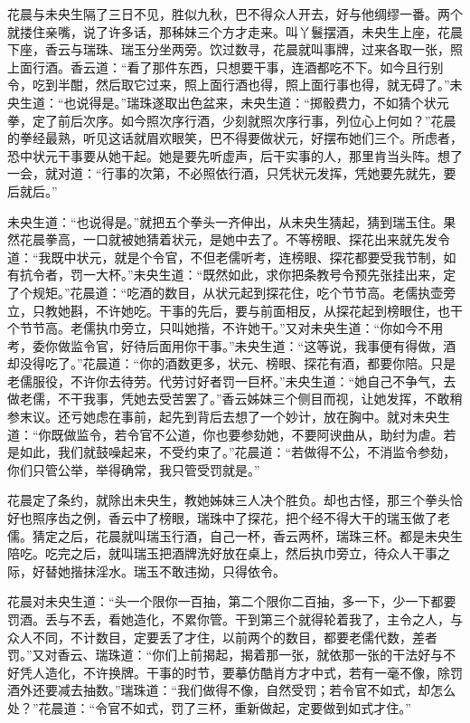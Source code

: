 \documentclass[a4paper,12pt,UTF8,twoside]{ctexbook}
\begin{document}
花晨与未央生隔了三日不见，胜似九秋，巴不得众人开去，好与他绸缪一番。两个就搂住亲嘴，说了许多话，那秭妹三个方才走来。叫丫鬟摆酒，未央生上座，花晨下座，香云与瑞珠、瑞玉分坐两旁。饮过数寻，花晨就叫事牌，过来各取一张，照上面行酒。香云道：“看了那件东西，只想要干事，连酒都吃不下。如今且行别令，吃到半酣，然后取它过来，照上面行酒也得，照上面行事也得，就无碍了。”未央生道：“也说得是。”瑞珠遂取出色盆来，未央生道：“掷骰费力，不如猜个状元拳，定了前后次序。如今照次序行酒，少刻就照次序行事，列位心上何如？”花晨的拳经最熟，听见这话就眉欢眼笑，巴不得要做状元，好摆布她们三个。所虑者，恐中状元干事要从她干起。她是要先听虚声，后干实事的人，那里肯当头阵。想了一会，就对道：“行事的次第，不必照依行酒，只凭状元发挥，凭她要先就先，要后就后。”

未央生道：“也说得是。”就把五个拳头一齐伸出，从未央生猜起，猜到瑞玉住。果然花晨拳高，一口就被她猜着状元，是她中去了。不等榜眼、探花出来就先发令道：“我既中状元，就是个令官，不但老儒听考，连榜眼、探花都要受我节制，如有抗令者，罚一大杯。”未央生道：“既然如此，求你把条教号令预先张挂出来，定了个规矩。”花晨道：“吃酒的数目，从状元起到探花住，吃个节节高。老儒执壶旁立，只教她斟，不许她吃。干事的先后，要与前面相反，从探花起到榜眼住，也干个节节高。老儒执巾旁立，只叫她揩，不许她干。”又对未央生道：“你如今不用考，委你做监令官，好待后面用你干事。”未央生道：“这等说，我事便有得做，酒却没得吃了。”花晨道：“你的酒数更多，状元、榜眼、探花有酒，都要你陪。只是老儒服役，不许你去待劳。代劳讨好者罚一巨杯。”未央生道：“她自己不争气，去做老儒，不干我事，凭她去受苦罢了。”香云姊妹三个侧目而视，让她发挥，不敢稍参末议。还亏她虑在事前，起先到背后去想了一个妙计，放在胸中。就对未央生道：“你既做监令，若令官不公道，你也要参劾她，不要阿谀曲从，助纣为虐。若是如此，我们就鼓噪起来，不受约束了。”花晨道：“若做得不公，不消监令参劾，你们只管公举，举得确常，我只管受罚就是。”

花晨定了条约，就除出未央生，教她姊妹三人决个胜负。却也古怪，那三个拳头恰好也照序齿之例，香云中了榜眼，瑞珠中了探花，把个经不得大干的瑞玉做了老儒。猜定之后，花晨就叫瑞玉行酒，自己一杯，香云两杯，瑞珠三杯。都是未央生陪吃。吃完之后，就叫瑞玉把酒牌洗好放在桌上，然后执巾旁立，待众人干事之际，好替她揩抹淫水。瑞玉不敢违拗，只得依令。

花晨对未央生道：“头一个限你一百抽，第二个限你二百抽，多一下，少一下都要罚酒。丢与不丢，看她造化，不累你管。干到第三个就得轮着我了，主令之人，与众人不同，不计数目，定要丢了才住，以前两个的数目，都要老儒代数，差者罚。”又对香云、瑞珠道：“你们上前揭起，揭着那一张，就依那一张的干法好与不好凭人造化，不许换牌。干事的时节，要摹仿酷肖方才中式，若有一毫不像，除罚酒外还要减去抽数。”瑞珠道：“我们做得不像，自然受罚；若令官不如式，却怎么处？”花晨道：“令官不如式，罚了三杯，重新做起，定要做到如式才住。”
\end{document}
